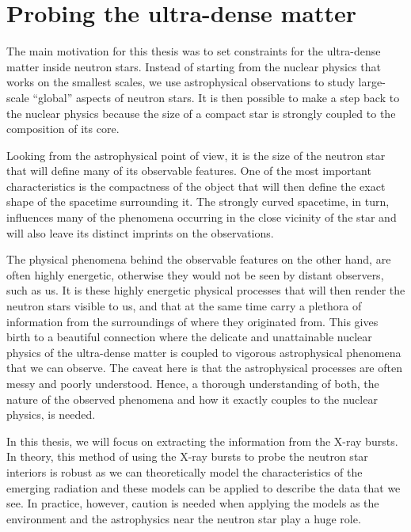 \chapter{Probing the ultra-dense matter}

The main motivation for this thesis was to set constraints for the ultra-dense matter inside neutron stars.
Instead of starting from the nuclear physics that works on the smallest scales, we use astrophysical observations to study large-scale ``global'' aspects of neutron stars.
It is then possible to make a step back to the nuclear physics because the size of a compact star is strongly coupled to the composition of its core.

Looking from the astrophysical point of view, it is the size of the neutron star that will define many of its observable features.
One of the most important characteristics is the compactness of the object that will then define the exact shape of the spacetime surrounding it.
The strongly curved spacetime, in turn, influences many of the phenomena occurring in the close vicinity of the star and will also leave its distinct imprints on the observations.

The physical phenomena behind the observable features on the other hand, are often highly energetic, otherwise they would not be seen by distant observers, such as us.
It is these highly energetic physical processes that will then render the neutron stars visible to us, and that at the same time carry a plethora of information from the surroundings of where they originated from.
This gives birth to a beautiful connection where the delicate and unattainable nuclear physics of the ultra-dense matter is coupled to vigorous astrophysical phenomena that we can observe.
The caveat here is that the astrophysical processes are often messy and poorly understood.
Hence, a thorough understanding of both, the nature of the observed phenomena and how it exactly couples to the nuclear physics, is needed.

In this thesis, we will focus on extracting the information from the X-ray bursts.
In theory, this method of using the X-ray bursts to probe the neutron star interiors is robust as we can theoretically model the characteristics of the emerging radiation and these models can be applied to describe the data that we see. 
In practice, however, caution is needed when applying the models as the environment and the astrophysics near the neutron star play a huge role.


